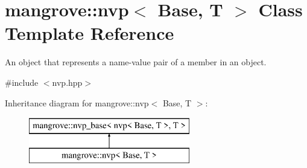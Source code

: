 \hypertarget{classmangrove_1_1nvp}{}\section{mangrove\+:\+:nvp$<$ Base, T $>$ Class Template Reference}
\label{classmangrove_1_1nvp}


An object that represents a name-\/value pair of a member in an object.  




{\ttfamily \#include $<$nvp.\+hpp$>$}

Inheritance diagram for mangrove\+:\+:nvp$<$ Base, T $>$\+:\begin{figure}[H]
\begin{center}
\leavevmode
\includegraphics[height=2.000000cm]{classmangrove_1_1nvp}
\end{center}
\end{figure}
